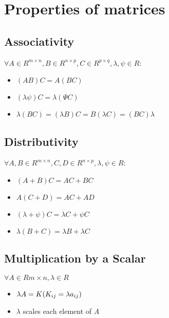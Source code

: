 \section{Properties of matrices}

\subsection{Associativity \cite{mfml-1}}\label{matrix: Associativity}

$\forall A \in R^{m\times n} , B \in R^{n\times p} , C \in R^{p\times q} , \lambda, \psi \in R$:

\begin{itemize}
    \item $(AB)C = A(BC)$
    
    \item $(\lambda\psi)C = \lambda(\Psi C)$

    \item  $\lambda(BC) = (\lambda B)C = B(\lambda C) = (BC)\lambda$
\end{itemize}


\subsection{Distributivity \cite{mfml-1}}\label{matrix: Distributivity}

$\forall A, B \in R^{m\times n} , C, D \in R^{n\times p} , \lambda, \psi \in R$:

\begin{itemize}
    \item $(A + B)C = AC + BC$
    \item $A(C + D) = AC + AD$
    \item $(\lambda + \psi)C = \lambda C + \psi C$
    \item $\lambda (B + C) = \lambda B + \lambda C$
\end{itemize}



\subsection{Multiplication by a Scalar \cite{mfml-1}} \label{matrix: Multiplication by a Scalar}
$\forall A \in  Rm\times n , \lambda  \in  R$

\begin{itemize}

    \item $\lambda A = K \hfill (K_{ij} = \lambda a_{ij})$

    \item $\lambda$ scales each element of $A$
\end{itemize}


